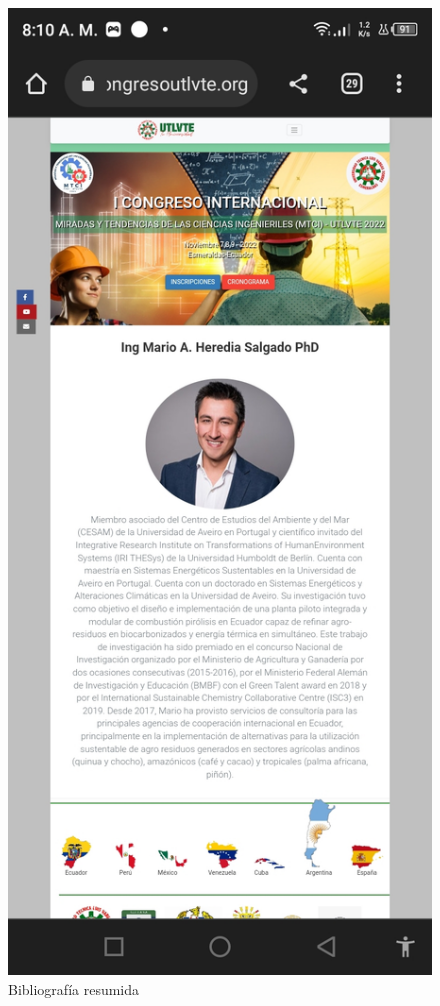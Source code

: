 \documentclass[a4paper,14px]{article}
\begin{document}
\begin{minipage}[H]{0.5\linewidth}
  \begin{figure}[H]
    \centering
    \includegraphics[scale=0.3]{bibliografia.jpg}
    \caption{Bibliografía resumida}
    \label{fig:conferensistas}
  \end{figure}
\end{minipage}
\end{document}
